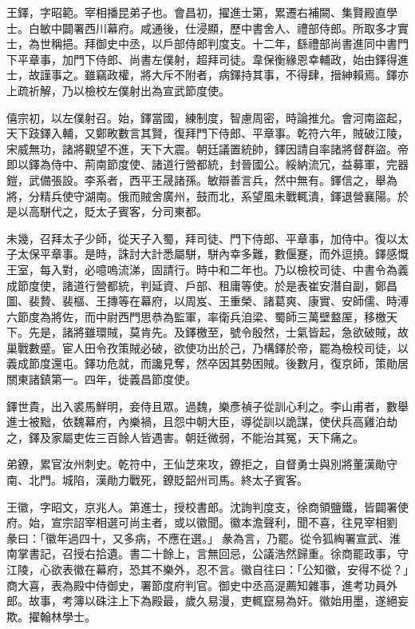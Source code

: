 \begin{pinyinscope}
 王鐸，字昭範。宰相播昆弟子也。會昌初，擢進士第，累遷右補闕、集賢殿直學士。白敏中闢署西川幕府。咸通後，仕浸顯，歷中書舍人、禮部侍郎。所取多才實士，為世稱挹。拜御史中丞，以戶部侍郎判度支。十二年，繇禮部尚書進同中書門下平章事，加門下侍郎、尚書左僕射，超拜司徒。韋保衡緣恩幸輔政，始由鐸得進士，故謹事之。雖竊政權，將大斥不附者，病鐸持其事，不得肆，搢紳賴焉。鐸亦上疏祈解，乃以檢校左僕射出為宣武節度使。



 僖宗初，以左僕射召。始，鐸當國，練制度，智慮周密，時論推允。會河南盜起，天下跂鐸入輔，又鄭畋數言其賢，復拜門下侍郎、平章事。乾符六年，賊破江陵，宋威無功，諸將觀望不進，天下大震。朝廷議置統帥，鐸因請自率諸將督群盜。帝即以鐸為侍中、荊南節度使、諸道行營都統，封晉國公。綏納流冗，益募軍，完器鎧，武備張設。李系者，西平王晟諸孫。敏辯善言兵，然中無有。鐸信之，舉為將，分精兵使守湖南。俄而賊舍廣州，鼓而北，系望風未戰輒潰，鐸退營襄陽。於是以高駢代之，貶太子賓客，分司東都。



 未幾，召拜太子少師，從天子入蜀，拜司徒、門下侍郎、平章事，加侍中。復以太子太保平章事。是時，誅討大計悉屬駢，駢內幸多難，數偃蹇，而外逗撓。鐸感慨王室，每入對，必噫嗚流涕，固請行。時中和二年也。乃以檢校司徒、中書令為義成節度使，諸道行營都統，判延資、戶部、租庸等使。於是表崔安潛自副，鄭昌圖、裴贄、裴樞、王摶等在幕府，以周岌、王重榮、諸葛爽、康實、安師儒、時溥六節度為將佐，而中尉西門思恭為監軍，率衛兵洎梁、蜀師三萬壁盩厔，移檄天下。先是，諸將雖環賊，莫肯先。及鐸檄至，號令殷然，士氣皆起，急欲破賊，故巢戰數蹙。宦人田令孜策賊必破，欲使功出於己，乃構鐸於帝，罷為檢校司徒，以義成節度還屯。鐸功危就，而讒見奪，然卒因其勢困賊。後數月，復京師，策勛居關東諸鎮第一。四年，徙義昌節度使。



 鐸世貴，出入裘馬鮮明，妾侍且眾。過魏，樂彥禎子從訓心利之。李山甫者，數舉進士被黜，依魏幕府，內樂禍，且怨中朝大臣，導從訓以詭謀，使伏兵高雞泊劫之，鐸及家屬吏佐三百餘人皆遇害。朝廷微弱，不能治其冤，天下痛之。



 弟鐐，累官汝州刺史。乾符中，王仙芝來攻，鐐拒之，自督勇士與別將董漢勛守南、北門。城陷，漢勛力戰死，鐐貶韶州司馬。終太子賓客。



 王徽，字昭文，京兆人。第進士，授校書郎。沈詢判度支，徐商領鹽鐵，皆闢署使府。始，宣宗詔宰相選可尚主者，或以徽聞。徽本澹聲利，聞不喜，往見宰相劉彖曰：「徽年過四十，又多病，不應在選。」彖為言，乃罷。從令狐綯署宣武、淮南掌書記，召授右拾遺。書二十餘上，言無回忌，公議浩然歸重。徐商罷政事，守江陵，心欲表徽在幕府，恐其不樂外，忍不言。徽自往曰：「公知徽，安得不從？」商大喜，表為殿中侍御史，署節度府判官。御史中丞高湜薦知雜事，進考功員外郎。故事，考簿以硃注上下為殿最，歲久易漫，吏輒竄易為奸。徽始用墨，遂絕妄欺。擢翰林學士。




\end{pinyinscope}
